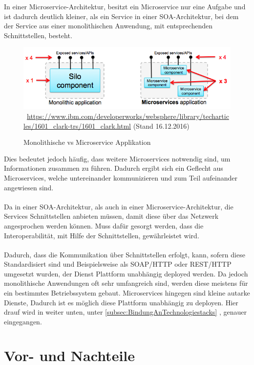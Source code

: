 In einer Microservice-Architektur, besitzt ein Microservice nur eine Aufgabe und ist dadurch deutlich kleiner, als ein Service in einer SOA-Architektur, bei dem der Service aus einer monolithischen Anwendung, mit entsprechenden Schnittstellen, besteht.
\begin{figure}[htb]
    \centering 
    \includegraphics[width=\linewidth]{content/images/MonolithicVsMicroservice}\
    \quelle\url{https://www.ibm.com/developerworks/websphere/library/techarticles/1601_clark-trs/1601_clark.html} (Stand 16.12.2016)
    \caption{Monolithische vs Microservice Applikation}
    \label{fig:MonolithicVsMicroservice} 
\end{figure}
\newpage
Dies bedeutet jedoch häufig, dass weitere Microservices notwendig sind, um Informationen zusammen zu führen. Dadurch ergibt sich ein Geflecht aus Microservices, welche untereinander kommunizieren und zum Teil aufeinander angewiesen sind.
\\\\
Da in einer SOA-Architektur, als auch in einer Microservice-Architektur, die Services Schnittstellen anbieten müssen, damit diese über das Netzwerk angesprochen werden können. Muss dafür gesorgt werden, dass die Interoperabilität, mit Hilfe der Schnittstellen, gewährleistet wird.
\\\\
Dadurch, dass die Kommunikation über Schnittstellen erfolgt, kann, sofern diese Standardisiert sind und Beispielsweise als SOAP/HTTP oder REST/HTTP umgesetzt wurden, der Dienst Plattform unabhängig deployed werden. Da jedoch monolithische Anwendungen oft sehr umfangreich sind, werden diese meistens für ein bestimmtes Betriebssystem gebaut. Microservices hingegen sind kleine autarke Dienste, Dadurch ist es möglich diese Plattform unabhängig zu deployen. Hier drauf wird in weiter unten, unter \ref{subsec:BindungAnTechnologiestacks} , genauer eingegangen.

\section{Vor- und Nachteile}
\label{sec:VorUndNachteile}

